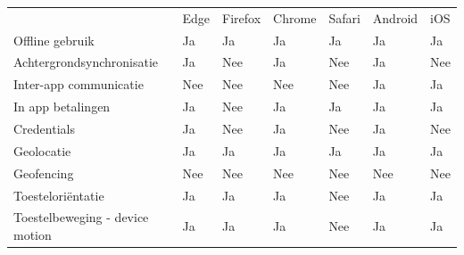 	 		\begin{table}[]
	 			\centering
				\begin{tabular}{p{6cm}p{13mm}p{13mm}p{13mm}p{13mm}p{13mm}p{13mm}}
	 			
					& Edge & Firefox & Chrome & Safari& Android & iOS \\ 
				   
				   Offline gebruik & \cellcolor{green!40} Ja  & \cellcolor{green!40} Ja & \cellcolor{green!40} Ja  & \cellcolor{green!40} Ja & \cellcolor{green!40} Ja & \cellcolor{green!40} Ja \\
				   
				   Achtergrondsynchronisatie & \cellcolor{green!40} Ja  &  \cellcolor{red!50} Nee& \cellcolor{green!40} Ja  &  \cellcolor{red!50} Nee& \cellcolor{green!40} Ja & \cellcolor{red!50} Nee \\
				   
				   Inter-app communicatie & \cellcolor{red!50} Nee  &  \cellcolor{red!50} Nee& \cellcolor{red!50} Nee  &  \cellcolor{red!50} Nee& \cellcolor{green!40} Ja & \cellcolor{green!40} Ja \\
				   
				   In app betalingen & \cellcolor{green!40} Ja  &\cellcolor{red!50} Nee & \cellcolor{green!40} Ja  & \cellcolor{green!40} Ja & \cellcolor{green!40} Ja & \cellcolor{green!40} Ja \\
				   
				   Credentials & \cellcolor{green!40} Ja  & \cellcolor{red!50} Nee & \cellcolor{green!40} Ja  & \cellcolor{red!50} Nee & \cellcolor{green!40} Ja & \cellcolor{red!50} Nee \\
				   
				   Geolocatie & \cellcolor{green!40} Ja  & \cellcolor{green!40} Ja & \cellcolor{green!40} Ja  & \cellcolor{green!40} Ja & \cellcolor{green!40} Ja & \cellcolor{green!40} Ja \\
				   
				   Geofencing &  \cellcolor{red!50} Nee  &  \cellcolor{red!50} Nee &  \cellcolor{red!50} Nee  & \cellcolor{red!50} Nee &  \cellcolor{red!50} Nee &  \cellcolor{red!50} Nee \\
				   
				   Toesteloriëntatie & \cellcolor{green!40} Ja  & \cellcolor{green!40} Ja & \cellcolor{green!40} Ja  & \cellcolor{red!50} Nee& \cellcolor{green!40} Ja & \cellcolor{green!40} Ja \\
				   
				   Toestelbeweging - device motion & \cellcolor{green!40} Ja  & \cellcolor{green!40} Ja & \cellcolor{green!40} Ja  & \cellcolor{red!50} Nee& \cellcolor{green!40} Ja & \cellcolor{green!40} Ja \\
				   

\end{tabular}
\end{table}

